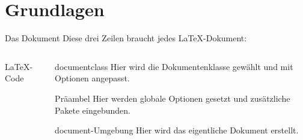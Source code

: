 \section{Grundlagen}

\begin{frame}[fragile]{Das Dokument}
  Diese drei Zeilen braucht jedes \LaTeX-Dokument:
  \begin{columns}[T]
    \begin{column}{0.47\textwidth}
      \begin{block}{\LaTeX-Code}
      \end{block}
    \end{column}
    \begin{column}{0.47\textwidth}
      \begin{block}{documentclass}
        Hier wird die Dokumentenklasse gewählt und mit Optionen angepasst.
      \end{block}
      \begin{block}{Präambel}
        Hier werden globale Optionen gesetzt und zusätzliche Pakete eingebunden.
      \end{block}
      \begin{block}{document-Umgebung}
        Hier wird das eigentliche Dokument erstellt.
      \end{block}
    \end{column}
  \end{columns}
\end{frame}

